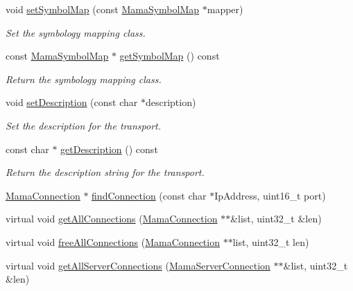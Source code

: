 \begin{DoxyCompactItemize}
void \hyperlink{classWombat_1_1MamaTransport_ac81d6c94ae90b140acbe5f4d2b69b156}{setSymbolMap} (const \hyperlink{classWombat_1_1MamaSymbolMap}{MamaSymbolMap} $\ast$mapper)
\begin{DoxyCompactList}\small\item\em Set the symbology mapping class. \item\end{DoxyCompactList}\item 
const \hyperlink{classWombat_1_1MamaSymbolMap}{MamaSymbolMap} $\ast$ \hyperlink{classWombat_1_1MamaTransport_a579ad7e9ab5e00e62cf634cbf9256055}{getSymbolMap} () const 
\begin{DoxyCompactList}\small\item\em Return the symbology mapping class. \item\end{DoxyCompactList}\item 
void \hyperlink{classWombat_1_1MamaTransport_af6e11ba1a55d2a8716888bdfe49bc2b6}{setDescription} (const char $\ast$description)
\begin{DoxyCompactList}\small\item\em Set the description for the transport. \item\end{DoxyCompactList}\item 
const char $\ast$ \hyperlink{classWombat_1_1MamaTransport_ad3f2a64e9c98f5c5562aa58cd93f0529}{getDescription} () const 
\begin{DoxyCompactList}\small\item\em Return the description string for the transport. \item\end{DoxyCompactList}\item 
\hyperlink{classWombat_1_1MamaConnection}{MamaConnection} $\ast$ \hyperlink{classWombat_1_1MamaTransport_a7a202932111eceeffe410a713de76a0e}{findConnection} (const char $\ast$IpAddress, uint16\_\-t port)
\item 
virtual void \hyperlink{classWombat_1_1MamaTransport_afb8b42ec79dd7407ee0ef2b32f0dc74a}{getAllConnections} (\hyperlink{classWombat_1_1MamaConnection}{MamaConnection} $\ast$$\ast$\&list, uint32\_\-t \&len)
\item 
virtual void \hyperlink{classWombat_1_1MamaTransport_a2085dd9d95f10e9be371d147f573905a}{freeAllConnections} (\hyperlink{classWombat_1_1MamaConnection}{MamaConnection} $\ast$$\ast$list, uint32\_\-t len)
\item 
virtual void \hyperlink{classWombat_1_1MamaTransport_a920be68f58b955170dc81e6386d4526c}{getAllServerConnections} (\hyperlink{classWombat_1_1MamaServerConnection}{MamaServerConnection} $\ast$$\ast$\&list, uint32\_\-t \&len)
$$
\end{DoxyCompactItemize}
